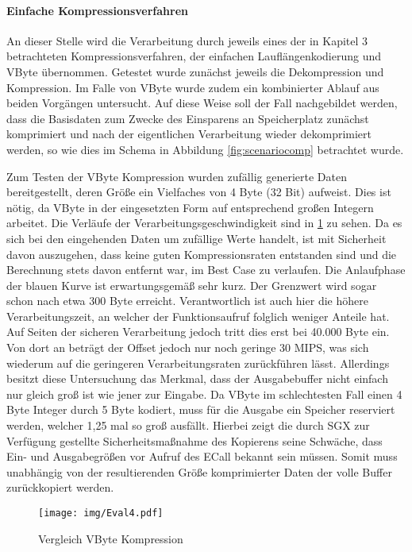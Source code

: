 \paragraph{Einfache Kompressionsverfahren}

An dieser Stelle wird die Verarbeitung durch jeweils eines der in Kapitel 3 betrachteten Kompressionsverfahren, der einfachen Lauflängenkodierung und VByte übernommen. Getestet wurde zunächst jeweils die Dekompression und Kompression. Im Falle von VByte wurde zudem ein kombinierter Ablauf aus beiden Vorgängen untersucht. Auf diese Weise soll der Fall nachgebildet werden, dass die Basisdaten zum Zwecke des Einsparens an Speicherplatz zunächst komprimiert und nach der eigentlichen Verarbeitung wieder dekomprimiert werden, so wie dies im Schema in Abbildung \ref{fig:scenariocomp} betrachtet wurde.

Zum Testen der VByte Kompression wurden zufällig generierte Daten bereitgestellt, deren Größe ein Vielfaches von 4 Byte (32 Bit) aufweist. Dies ist nötig, da VByte in der eingesetzten Form auf entsprechend großen Integern arbeitet. Die Verläufe der Verarbeitungsgeschwindigkeit sind in \ref{fig:eval4} zu sehen. Da es sich bei den eingehenden Daten um zufällige Werte handelt, ist mit Sicherheit davon auszugehen, dass keine guten Kompressionsraten entstanden sind und die Berechnung stets davon entfernt war, im Best Case zu verlaufen. Die Anlaufphase der blauen Kurve ist erwartungsgemäß sehr kurz. Der Grenzwert wird sogar schon nach etwa 300 Byte erreicht. Verantwortlich ist auch hier die höhere Verarbeitungszeit, an welcher der Funktionsaufruf folglich weniger Anteile hat. Auf Seiten der sicheren Verarbeitung jedoch tritt dies erst bei 40.000 Byte ein. Von dort an beträgt der Offset jedoch nur noch geringe 30 \ac{MIPS}, was sich wiederum auf die geringeren Verarbeitungsraten zurückführen lässt. Allerdings besitzt diese Untersuchung das Merkmal, dass der Ausgabebuffer nicht einfach nur gleich groß ist wie jener zur Eingabe. Da VByte im schlechtesten Fall einen 4 Byte Integer durch 5 Byte kodiert, muss für die Ausgabe ein Speicher reserviert werden, welcher 1,25 mal so groß ausfällt. Hierbei zeigt die durch \ac{SGX} zur Verfügung gestellte Sicherheitsmaßnahme des Kopierens seine Schwäche, dass Ein- und Ausgabegrößen vor Aufruf des \ac{ECall} bekannt sein müssen. Somit muss unabhängig von der resultierenden Größe komprimierter Daten der volle Buffer zurückkopiert werden.

\begin{figure}[h]
	\texttt{[image: img/Eval4.pdf]}
	\centering
	\caption{Vergleich VByte Kompression}
	\label{fig:eval4}
\end{figure}


